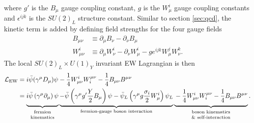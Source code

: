 \documentclass[../thesis.tex]{subfiles}
\begin{document}
where $g'$ is the $B_\mu$ gauge coupling constant, $g$ is the $W^i_\mu$ gauge coupling constants and $\epsilon^{ijk}$ is the $SU(2)_L$ structure constant. 
Similar to section \ref{sec:qcd}, the kinetic term is added by defining field strengths for the four gauge fields
\begin{equation}
\begin{aligned}
B_{\mu \nu}   &\equiv \partial_\mu B_\nu - \partial_\nu B_\mu \\
W_{\mu \nu}^i &\equiv \partial_\mu W^i_\nu - \partial_\nu W^i_\mu - g e^{ijk} W^j_\mu W^k_\nu.
\end{aligned}
\end{equation}
The local $SU(2)_L \times U(1)_Y$ invariant \acs{EW} Lagrangian \citep{theory:ew} is then
\begin{equation}
\begin{aligned}
\mathcal{L}_\text{EW} &= i\bar{\psi}(\gamma^\mu D_\mu)\psi - \frac{1}{4}W^i_{\mu\nu}W_i^{\mu\nu} - \frac{1}{4}B_{\mu\nu}B^{\mu\nu} \\
&= \underbrace{\vphantom{\left(\frac{Y}{2}\right)}
i\bar{\psi}\left(\gamma^\mu\partial_\mu\right)\psi
}_{\substack{\text{fermion}\vphantom{\frac{1}{4}}\\ \text{kinematics}}}
\underbrace{
-\bar{\psi}\left(\gamma^\mu g'\frac{Y}{2}B_\mu\right)\psi - \bar{\psi}_L\left(\gamma^\mu g\frac{\sigma_i}{2}W_\mu^i\right)\psi_L
}_\text{fermion-gauge boson interaction}
\underbrace{\vphantom{\left(\frac{Y}{2}\right)}
-\frac{1}{4}W^i_{\mu\nu}W_i^{\mu\nu} - \frac{1}{4}B_{\mu\nu}B^{\mu\nu}
}_{\substack{\text{boson kinematics}\vphantom{\frac{1}{4}}\\ \text{\& self-interaction}}}.
\end{aligned}
\end{equation}
\end{document}
